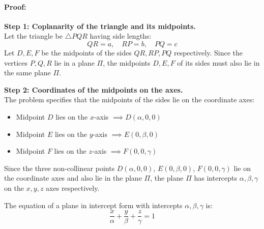 \documentclass[11pt,a4paper]{article}
\begin{document}
\paragraph{Proof:}
\textbf{Step 1: Coplanarity of the triangle and its midpoints.}\\
Let the triangle be $\triangle PQR$ having side lengths:
$$QR = a, \quad RP = b, \quad PQ = c$$
Let $D, E, F$ be the midpoints of the sides $QR, RP, PQ$ respectively.
Since the vertices $P, Q, R$ lie in a plane $\Pi$, the midpoints $D, E, F$ of its sides must also lie in the same plane $\Pi$.

\textbf{Step 2: Coordinates of the midpoints on the axes.}\\
The problem specifies that the midpoints of the sides lie on the coordinate axes:
\begin{itemize}
    \item Midpoint $D$ lies on the $x$-axis $\implies D(\alpha, 0, 0)$
    \item Midpoint $E$ lies on the $y$-axis $\implies E(0, \beta, 0)$
    \item Midpoint $F$ lies on the $z$-axis $\implies F(0, 0, \gamma)$
\end{itemize}
Since the three non-collinear points $D(\alpha, 0, 0)$, $E(0, \beta, 0)$, $F(0, 0, \gamma)$ lie on the coordinate axes and also lie in the plane $\Pi$, the plane $\Pi$ has intercepts $\alpha, \beta, \gamma$ on the $x, y, z$ axes respectively.

The equation of a plane in intercept form with intercepts $\alpha, \beta, \gamma$ is:
$$\frac{x}{\alpha} + \frac{y}{\beta} + \frac{z}{\gamma} = 1$$
\end{document}
